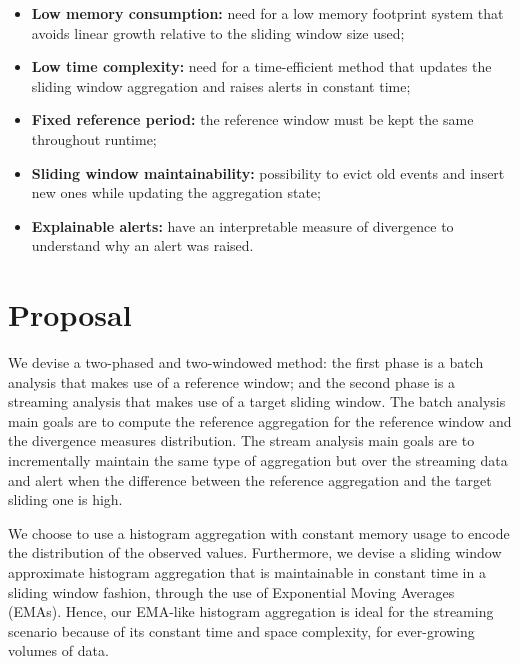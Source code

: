 \begin{itemize}
    \item \textbf{Low memory consumption:} need for a low memory footprint system that avoids linear growth relative to the sliding window size used;
    
    \item \textbf{Low time complexity:} need for a time-efficient method that updates the sliding window aggregation and raises alerts in constant time;
    
    \item \textbf{Fixed reference period:} the reference window must be kept the same throughout runtime;
    
    \item \textbf{Sliding window maintainability:} possibility to evict old events and insert new ones while updating the aggregation state;
    
    \item \textbf{Explainable alerts:} have an interpretable measure of divergence to understand why an alert was raised.
\end{itemize}


\section{Proposal} \label{sec:proposal}
We devise a two-phased and two-windowed method: the first phase is a batch analysis that makes use of a reference window; and the second phase is a streaming analysis that makes use of a target sliding window. The batch analysis main goals are to compute the reference aggregation for the reference window and the divergence measures distribution. The stream analysis main goals are to incrementally maintain the same type of aggregation but over the streaming data and alert when the difference between the reference aggregation and the target sliding one is high.

We choose to use a histogram aggregation with constant memory usage to encode the distribution of the observed values. Furthermore, we devise a sliding window approximate histogram aggregation that is maintainable in constant time in a sliding window fashion, through the use of Exponential Moving Averages (EMAs). Hence, our EMA-like histogram aggregation is ideal for the streaming scenario because of its constant time and space complexity, for ever-growing volumes of data.

